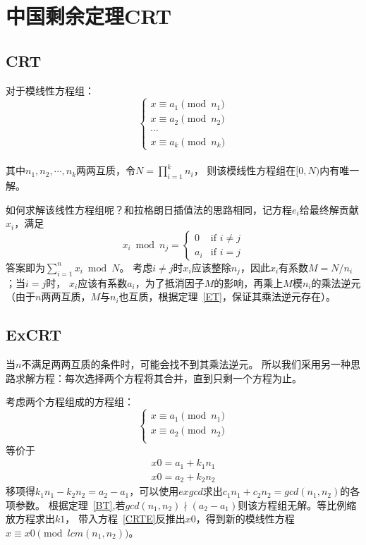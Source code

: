 \section{中国剩余定理CRT}
\subsection{CRT}
\begin{theorem}
	对于模线性方程组：
	\begin{displaymath}
		\left\{\begin{array}{l}
			x \equiv a_1 \pmod{n_1} \\
			x \equiv a_2 \pmod{n_2} \\
			\cdots                  \\
			x \equiv a_k \pmod{n_k}
		\end{array}\right.
	\end{displaymath}\\
	其中$n_1,n_2,\cdots,n_k$两两互质，令$\displaystyle N=\prod_{i=1}^k{n_i}$，
	则该模线性方程组在$[0,N)$内有唯一解。
\end{theorem}
如何求解该线性方程组呢？和拉格朗日插值法的思路相同，记方程$e_i$给最终解贡献$x_i$，满足
\begin{displaymath}
	x_i \bmod n_j =
	\left\{\begin{array}{ll}
		0   & \textrm{if $i\neq j$} \\
		a_i & \textrm{if $i=j$}
	\end{array}\right.
\end{displaymath}
答案即为$\displaystyle \sum_{i=1}^n{x_i} \bmod N$。
考虑$i\neq j$时$x_i$应该整除$n_j$，因此$x_i$有系数$M=N/n_i$；当$i=j$时，
$x_i$应该有系数$a_i$，为了抵消因子$M$的影响，再乘上$M$模$n_i$的乘法逆元
（由于$n$两两互质，$M$与$n_i$也互质，根据定理~\ref{ET}，保证其乘法逆元存在）。
\subsection{ExCRT}
当$n$不满足两两互质的条件时，可能会找不到其乘法逆元。
所以我们采用另一种思路求解方程：每次选择两个方程将其合并，直到只剩一个方程为止。

考虑两个方程组成的方程组：
\begin{displaymath}
	\left\{\begin{array}{l}
		x \equiv a_1 \pmod{n_1} \\
		x \equiv a_2 \pmod{n_2} \\
	\end{array}\right.
\end{displaymath}
等价于
\begin{eqnarray}
	x0=a_1+k_1n_1\label{CRTE}\\
	x0=a_2+k_2n_2
\end{eqnarray}
移项得$k_1n_1-k_2n_2=a_2-a_1$，可以使用$exgcd$求出$c_1n_1+c_2n_2=gcd(n_1,n_2)$的各项参数。
根据定理~\ref{BT},若$gcd(n_1,n_2)\nmid(a_2-a_1)$则该方程组无解。等比例缩放方程求出$k1$，
带入方程~\ref{CRTE}反推出$x0$，得到新的模线性方程$x \equiv x0\pmod{lcm(n_1,n_2)}$。
